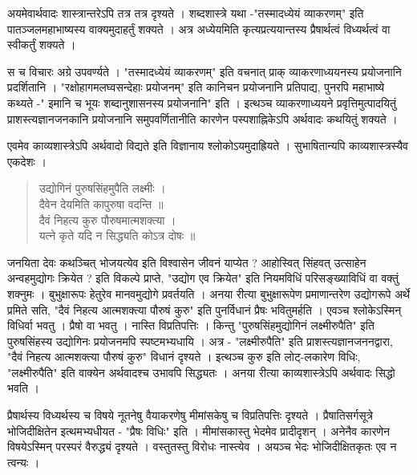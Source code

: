 अयमेवार्थवादः शास्त्रान्तरेऽपि तत्र तत्र दृश्यते । शब्दशास्त्रे यथा  -"तस्मादध्येयं व्याकरणम्" इति पातञ्जलमहाभाष्यस्य वाक्यमुदाहर्तुं शक्यते  । अत्र अध्येयमिति कृत्यप्रत्ययान्तस्य प्रैषार्थत्वं विध्यर्थत्वं वा स्वीकर्तुं शक्यते ।

स च विचारः अग्रे उपवर्ण्यते । "तस्मादध्येयं व्याकरणम्" इति वचनात् प्राक् व्याकरणाध्ययनस्य प्रयोजनानि प्रदर्शितानि । "रक्षोहागमलघ्वसन्देहाः प्रयोजनम्" इति कानिचन प्रयोजनानि प्रतिपाद्य, पुनरपि महाभाष्ये कथ्यते -" इमानि च भूयः शब्दानुशासनस्य प्रयोजनानि" इति । इत्थञ्च व्याकरणाध्ययने प्रवृत्तिमुत्पादयितुं प्राशस्त्यज्ञानजनकानि प्रयोजनानि समुपवर्णितानीति कारणेन पस्पशाह्निकेऽपि अर्थवादः कथयितुं शक्यते ।

एवमेव काव्यशास्त्रेऽपि अर्थवादो विद्यते इति विज्ञानाय श्लोकोऽयमुदाह्रियते । सुभाषितान्यपि काव्यशास्त्रस्यैव एकदेशः । 
\begin{verse}
उद्योगिनं पुरुषसिंहमुपैति लक्ष्मीः ।\\
दैवेन देयमिति कापुरुषा वदन्ति ॥\\
दैवं निहत्य कुरु पौरुषमात्मशक्त्या ।\\
यत्ने कृते यदि न सिद्ध्यति कोऽत्र दोषः ॥
\end{verse}
जनयिता देवः कथञ्चित् भोजयत्येव इति विश्वासेन जीवनं याप्येत ? आहोस्वित्  सिंहवत् उत्साहेन अन्वहमुद्योगः क्रियेत ? इति विकल्पे प्राप्ते, "उद्योग एव क्रियेत" इति नियमविधिं परिसङ्ख्याविधिं वा वक्तुं शक्नुमः । बुभुक्षारूपः हेतुरेव मानवमुद्योगे प्रवर्तयति । अनया रीत्या बुभुक्षारूपेण प्रमाणान्तरेण उद्योगरूपे अर्थे प्रमिते सति, "दैवं निहत्य आत्मशक्त्या पौरुषं कुरु" इति पुनर्विधानं प्रैषः भवितुमर्हति । एवञ्च श्लोकेऽस्मिन् विधिर्वा भवतु । प्रैषो वा भवतु । नास्ति विप्रतिपत्तिः । किन्तु "पुरुषसिंहमुद्योगिनं लक्ष्मीरुपैति" इति पुरुषसिंहस्य उद्योगिनः प्रयोजनमपि स्पष्टमभ्यधायि । अत्र - "लक्ष्मीरुपैति" इति प्राशस्त्यज्ञानजननद्वारा, "दैवं निहत्य आत्मशक्त्या पौरुषं कुरु" विधानं दृश्यते । इत्थञ्च कुरु इति लोट्-लकारेण विधिः, "लक्ष्मीरुपैति" इति वाक्येन अर्थवादश्च उभावपि सिद्ध्यतः । अनया रीत्या काव्यशास्त्रेऽपि अर्थवादः सिद्धो भवति ।

प्रैषार्थस्य विध्यर्थस्य च विषये नूतनेषु वैयाकरणेषु मीमांसकेषु च विप्रतिपत्तिः दृश्यते । प्रैषातिसर्गसूत्रे भोजिदीक्षितेन इत्थमभ्यधीयत - "प्रैषः विधिः" इति । मीमांसकास्तु भेदमेव प्रादीदृशन् । अनेनैव कारणेन विषयेऽस्मिन् परस्परं वैरुद्ध्यं दृश्यते । वस्तुतस्तु विरोधः नास्त्येव । अयञ्च भेदः भोजिदीक्षितकृतः एव न त्वन्यः ।

